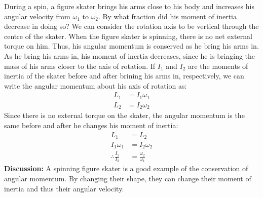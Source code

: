 \begin{example}{During a spin, a figure skater brings his arms close to his body and increases his angular velocity from $\omega_1$ to $\omega_2$. By what fraction did his moment of inertia decrease in doing so?}
We can consider the rotation axis to be vertical through the centre of the skater. When the figure skater is spinning, there is no net external torque on him. Thus, his angular momentum is conserved as he bring his arms in. As he bring his arms in, his moment of inertia decreases, since he is bringing the mass of his arms closer to the axis of rotation. If $I_1$ and $I_2$ are the moments of inertia of the skater before and after brining his arms in, respectively, we can write the angular momentum about his axis of rotation as:
\begin{align*}
L_1 &= I_1\omega_1\\
L_2 &= I_2\omega_2
\end{align*}
Since there is no external torque on the skater, the angular momentum is the same before and after he changes his moment of inertia:
\begin{align*}
L_1 &= L_2\\
I_1\omega_1 &= I_2\omega_2\\
\therefore \frac{I_1}{I_2} &= \frac{\omega_2}{\omega_1}
\end{align*}
\textbf{Discussion:} A spinning figure skater is a good example of the conservation of angular momentum. By changing their shape, they can change their moment of inertia and thus their angular velocity. 
\end{example}
\vspace{-0.25cm}
